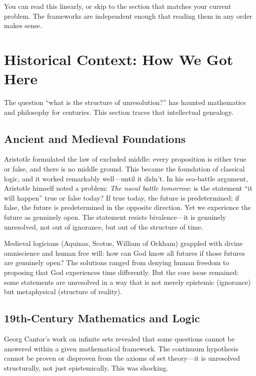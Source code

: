 \documentclass[11pt,letterpaper]{article}
\theoremstyle{definition}
\theoremstyle{remark}
\begin{document}
\vspace{0.3cm}

You can read this linearly, or skip to the section that matches your current problem. The frameworks are independent enough that reading them in any order makes sense.

\newpage

\section{Historical Context: How We Got Here}
\label{sec:history}

The question ``what is the structure of unresolution?'' has haunted mathematics and philosophy for centuries. This section traces that intellectual genealogy.

\subsection{Ancient and Medieval Foundations}

Aristotle formulated the law of excluded middle: every proposition is either true or false, and there is no middle ground. This became the foundation of classical logic, and it worked remarkably well---until it didn't. In his sea-battle argument, Aristotle himself noted a problem: \emph{The naval battle tomorrow}: is the statement ``it will happen'' true or false today? If true today, the future is predetermined; if false, the future is predetermined in the opposite direction. Yet we experience the future as genuinely open. The statement resists bivalence---it is genuinely unresolved, not out of ignorance, but out of the structure of time.

Medieval logicians (Aquinas, Scotus, William of Ockham) grappled with divine omniscience and human free will: how can God know all futures if those futures are genuinely open? The solutions ranged from denying human freedom to proposing that God experiences time differently. But the core issue remained: some statements are unresolved in a way that is not merely epistemic (ignorance) but metaphysical (structure of reality).

\subsection{19th-Century Mathematics and Logic}

Georg Cantor's work on infinite sets revealed that some questions cannot be answered within a given mathematical framework. The continuum hypothesis cannot be proven or disproven from the axioms of set theory---it is unresolved structurally, not just epistemically. This was shocking.
\end{document}

